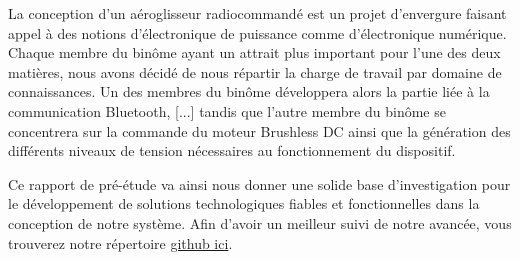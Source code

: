 \documentclass[a4paper,12pt]{report}
\begin{document}
	La conception d'un aéroglisseur radiocommandé est un projet d'envergure faisant appel à des notions d'électronique de puissance comme d'électronique numérique. Chaque membre du binôme ayant un attrait plus important pour l'une des deux matières, nous avons décidé de nous répartir la charge de travail par domaine de connaissances. Un des membres du binôme développera alors la partie liée à la communication Bluetooth, [...] tandis que l'autre membre du binôme se concentrera sur la commande du moteur Brushless DC ainsi que la génération des différents niveaux de tension nécessaires au fonctionnement du dispositif.
	
	Ce rapport de pré-étude va ainsi nous donner une solide base d'investigation pour le développement de solutions technologiques fiables et fonctionnelles dans la conception de notre système. Afin d'avoir un meilleur suivi de notre avancée, vous trouverez notre répertoire \href{https://github.com/tristanplouz/ProjetGE2}{github ici}.
	
	\listoffigures
	
	 
	
	
\end{document}
